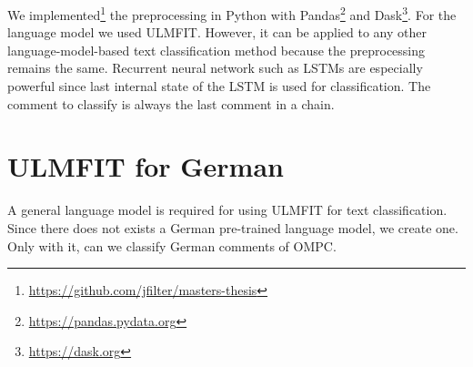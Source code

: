 We implemented\footnote{\url{https://github.com/jfilter/masters-thesis}} the preprocessing in Python with Pandas\footnote{\url{https://pandas.pydata.org}} and Dask\footnote{\url{https://dask.org}}.
For the language model we used ULMFIT.
However, it can be applied to any other language-model-based text classification method because the preprocessing remains the same.
Recurrent neural network such as LSTMs are especially powerful since last internal state of the LSTM is used for classification. The comment to classify is always the last comment in a chain.

\section{ULMFIT for German}
\label{sec:ulmfit_for_de}

A general language model is required for using ULMFIT for text classification.
Since there does not exists a German pre-trained language model, we create one. Only with it, can we classify German comments of OMPC.

